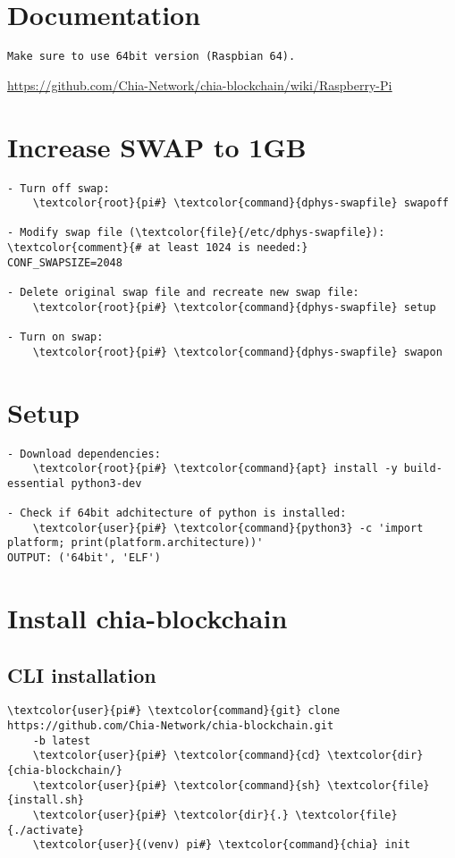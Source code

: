 \documentclass[10pt, a4paper, onecolumn, openany]{book} %
\begin{document}
\section{Documentation}
\begin{Verbatim}[commandchars=\\\{\}]
Make sure to use 64bit version (Raspbian 64).
\end{Verbatim}
\underline{\url{https://github.com/Chia-Network/chia-blockchain/wiki/Raspberry-Pi}}

\section{Increase SWAP to 1GB}
\begin{Verbatim}[commandchars=\\\{\}]
- Turn off swap:
    \textcolor{root}{pi#} \textcolor{command}{dphys-swapfile} swapoff
    
- Modify swap file (\textcolor{file}{/etc/dphys-swapfile}):
\textcolor{comment}{# at least 1024 is needed:}
CONF_SWAPSIZE=2048

- Delete original swap file and recreate new swap file:
    \textcolor{root}{pi#} \textcolor{command}{dphys-swapfile} setup
     
- Turn on swap:
    \textcolor{root}{pi#} \textcolor{command}{dphys-swapfile} swapon
\end{Verbatim}


\section{Setup}
\begin{Verbatim}[commandchars=\\\{\}]
- Download dependencies:
    \textcolor{root}{pi#} \textcolor{command}{apt} install -y build-essential python3-dev
    
- Check if 64bit adchitecture of python is installed:
    \textcolor{user}{pi#} \textcolor{command}{python3} -c 'import platform; print(platform.architecture))'
OUTPUT: ('64bit', 'ELF')
\end{Verbatim}

\section{Install chia-blockchain}
\subsection{CLI installation}
\begin{Verbatim}[commandchars=\\\{\}]
    \textcolor{user}{pi#} \textcolor{command}{git} clone https://github.com/Chia-Network/chia-blockchain.git
    -b latest
    \textcolor{user}{pi#} \textcolor{command}{cd} \textcolor{dir}{chia-blockchain/}
    \textcolor{user}{pi#} \textcolor{command}{sh} \textcolor{file}{install.sh}
    \textcolor{user}{pi#} \textcolor{dir}{.} \textcolor{file}{./activate}
    \textcolor{user}{(venv) pi#} \textcolor{command}{chia} init
\end{Verbatim}
\end{document}
